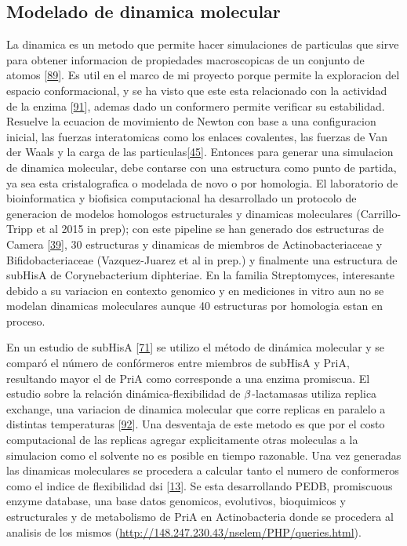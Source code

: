 \documentclass[12pt,twoside]{reedthesis}
\begin{document}
  \subsection{Modelado de dinamica
  molecular}\label{modelado-de-dinamica-molecular}
  
  La dinamica es un metodo que permite hacer simulaciones de particulas
  que sirve para obtener informacion de propiedades macroscopicas de un
  conjunto de atomos
  {[}\protect\hyperlink{ref-petrenko_molecular_2001}{89}{]}. Es util en el
  marco de mi proyecto porque permite la exploracion del espacio
  conformacional, y se ha visto que este esta relacionado con la actividad
  de la enzima {[}\protect\hyperlink{ref-sikosek_biophysics_2014}{91}{]},
  ademas dado un conformero permite verificar su estabilidad. Resuelve la
  ecuacion de movimiento de Newton con base a una configuracion inicial,
  las fuerzas interatomicas como los enlaces covalentes, las fuerzas de
  Van der Waals y la carga de las
  particulas{[}\protect\hyperlink{ref-campbell_biophysical_2012}{45}{]}.
  Entonces para generar una simulacion de dinamica molecular, debe
  contarse con una estructura como punto de partida, ya sea esta
  cristalografica o modelada de novo o por homologia. El laboratorio de
  bioinformatica y biofisica computacional ha desarrollado un protocolo de
  generacion de modelos homologos estructurales y dinamicas moleculares
  (Carrillo-Tripp et al 2015 in prep); con este pipeline se han generado
  dos estructuras de Camera
  {[}\protect\hyperlink{ref-noda-garcia_insights_2015}{39}{]}, 30
  estructuras y dinamicas de miembros de Actinobacteriaceae y
  Bifidobacteriaceae (Vazquez-Juarez et al in prep.) y finalmente una
  estructura de subHisA de Corynebacterium diphteriae. En la familia
  Streptomyces, interesante debido a su variacion en contexto genomico y
  en mediciones in vitro aun no se modelan dinamicas moleculares aunque 40
  estructuras por homologia estan en proceso.
  
  En un estudio de subHisA
  {[}\protect\hyperlink{ref-noda_tesis_2012}{71}{]} se utilizo el método
  de dinámica molecular y se comparó el número de confórmeros entre
  miembros de subHisA y PriA, resultando mayor el de PriA como corresponde
  a una enzima promiscua. El estudio sobre la relación
  dinámica-flexibilidad de \(\noindent\beta\)-lactamasas utiliza replica
  exchange, una variacion de dinamica molecular que corre replicas en
  paralelo a distintas temperaturas
  {[}\protect\hyperlink{ref-bai_replica_2006}{92}{]}. Una desventaja de
  este metodo es que por el costo computacional de las replicas agregar
  explicitamente otras moleculas a la simulacion como el solvente no es
  posible en tiempo razonable. Una vez generadas las dinamicas moleculares
  se procedera a calcular tanto el numero de conformeros como el indice de
  flexibilidad dsi {[}\protect\hyperlink{ref-zou_evolution_2015}{13}{]}.
  Se esta desarrollando PEDB, promiscuous enzyme database, una base datos
  genomicos, evolutivos, bioquimicos y estructurales y de metabolismo de
  PriA en Actinobacteria donde se procedera al analisis de los mismos
  (\url{http://148.247.230.43/nselem/PHP/queries.html}).
  
\end{document}
